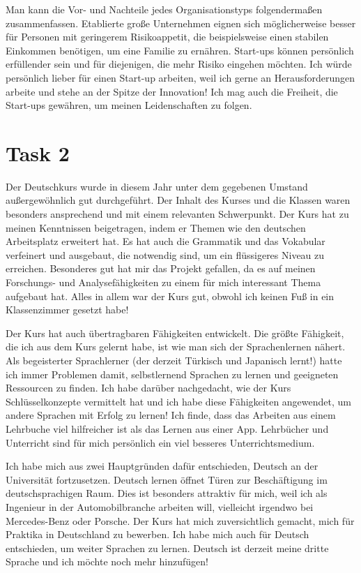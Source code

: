 \documentclass[11pt]{article}
\numberwithin{equation}{section}
\begin{document}
Man kann die Vor- und Nachteile jedes Organisationstyps folgendermaßen zusammenfassen. Etablierte große Unternehmen eignen sich möglicherweise besser für Personen mit geringerem Risikoappetit, die beispielsweise einen stabilen Einkommen benötigen, um eine Familie zu ernähren. Start-ups können persönlich erfüllender sein und für diejenigen, die mehr Risiko eingehen möchten. Ich würde persönlich lieber für einen Start-up arbeiten, weil ich gerne an Herausforderungen arbeite und stehe an der Spitze der Innovation! Ich mag auch die Freiheit, die Start-ups gewähren, um meinen Leidenschaften zu folgen.
\newpage
\section*{Task 2}
Der Deutschkurs wurde in diesem Jahr unter dem gegebenen Umstand außergewöhnlich gut durchgeführt. Der Inhalt des Kurses und die Klassen waren besonders ansprechend und mit einem relevanten Schwerpunkt. Der Kurs hat zu meinen Kenntnissen beigetragen, indem er Themen wie den deutschen Arbeitsplatz erweitert hat. Es hat auch die Grammatik und das Vokabular verfeinert und ausgebaut, die notwendig sind, um ein flüssigeres Niveau zu erreichen. Besonderes gut hat mir das Projekt gefallen, da es auf meinen Forschungs- und Analysefähigkeiten zu einem für mich interessant Thema aufgebaut hat. Alles in allem war der Kurs gut, obwohl ich keinen Fuß in ein Klassenzimmer gesetzt habe!

Der Kurs hat auch übertragbaren Fähigkeiten entwickelt. Die größte Fähigkeit, die ich aus dem Kurs gelernt habe, ist wie man sich der Sprachenlernen nähert. Als begeisterter Sprachlerner (der derzeit Türkisch und Japanisch lernt!) hatte ich immer Problemen damit, selbstlernend Sprachen zu lernen und geeigneten Ressourcen zu finden. Ich habe darüber nachgedacht, wie der Kurs Schlüsselkonzepte vermittelt hat und ich habe diese Fähigkeiten angewendet, um andere Sprachen mit Erfolg zu lernen! Ich finde, dass das Arbeiten aus einem Lehrbuche viel hilfreicher ist als das Lernen aus einer App. Lehrbücher und Unterricht sind für mich persönlich ein viel besseres Unterrichtsmedium.

Ich habe mich aus zwei Hauptgründen dafür entschieden, Deutsch an der Universität fortzusetzen. Deutsch lernen öffnet Türen zur Beschäftigung im deutschsprachigen Raum. Dies ist besonders attraktiv für mich, weil ich als Ingenieur in der Automobilbranche arbeiten will, vielleicht irgendwo bei Mercedes-Benz oder Porsche. Der Kurs hat mich zuversichtlich gemacht, mich für Praktika in Deutschland zu bewerben. Ich habe mich auch für Deutsch entschieden, um weiter Sprachen zu lernen. Deutsch ist derzeit meine dritte Sprache und ich möchte noch mehr hinzufügen! 
\end{document}
